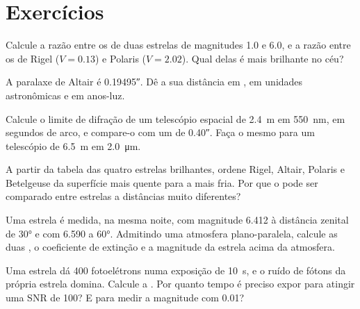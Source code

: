 \section{Exercícios}

\begin{exercise}[$\star$]\label{exo:b1:observing-the-sky:1}
Calcule a razão entre os  de duas estrelas de magnitudes 1.0 e 6.0, e a razão entre os de Rigel ($V = 0.13$) e Polaris ($V = 2.02$). Qual delas é mais brilhante no céu?
\end{exercise}

\begin{exercise}[$\star$]\label{exo:b1:observing-the-sky:2}
A paralaxe de Altair é \ang{;;0.19495}. Dê a sua distância em , em unidades astronômicas e em anos-luz.
\end{exercise}

\begin{exercise}[$\star$]\label{exo:b1:observing-the-sky:3}
Calcule o limite de difração de um telescópio espacial de \qty{2.4}{m} em \qty{550}{nm}, em segundos de arco, e compare-o com um  de \ang{;;0.40}. Faça o mesmo para um telescópio de \qty{6.5}{m} em \qty{2.0}{\micro\metre}.
\end{exercise}

\begin{exercise}[$\star$]\label{exo:b1:observing-the-sky:4}
A partir da tabela das quatro estrelas brilhantes, ordene Rigel, Altair, Polaris e Betelgeuse da superfície mais quente para a mais fria. Por que o  pode ser comparado entre estrelas a distâncias muito diferentes?
\end{exercise}

\begin{exercise}[$\star\star$]\label{exo:b1:observing-the-sky:5}
Uma estrela é medida, na mesma noite, com magnitude 6.412 à distância zenital de \ang{30} e com 6.590 a \ang{60}. Admitindo uma atmosfera plano-paralela, calcule as duas , o coeficiente de extinção e a magnitude da estrela acima da atmosfera.
\end{exercise}

\begin{exercise}[$\star\star$]\label{exo:b1:observing-the-sky:6}
Uma estrela dá 400 fotoelétrons numa exposição de \qty{10}{s}, e o ruído de fótons da própria estrela domina. Calcule a . Por quanto tempo é preciso expor para atingir uma SNR de 100? E para medir a magnitude com \num{0.01}?
\end{exercise}

